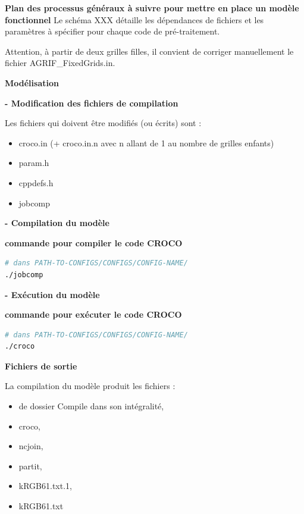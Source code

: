 \documentclass[10pt,a4paper,titlepage]{article}
\begin{document}
\begin{processEnv}{\textbf{Plan des processus généraux à suivre pour mettre en place un modèle fonctionnel}}
    Le schéma XXX détaille les dépendances de fichiers et les paramètres à spécifier pour chaque code de pré-traitement.

    Attention, à partir de deux grilles filles, il convient de corriger manuellement le fichier AGRIF\_FixedGrids.in.

    {\color{workColor}\textbf{Modélisation}}

    \textbf{- Modification des fichiers de compilation}

    Les fichiers qui doivent être modifiés (ou écrits) sont :

    \begin{itemize}
        \item croco.in (+ croco.in.n avec n allant de 1 au nombre de grilles enfants)
        \item param.h
        \item cppdefs.h
        \item jobcomp
    \end{itemize}

    \textbf{- Compilation du modèle}

    \begin{codeEnv}{\textbf{commande pour compiler le code CROCO}}
\begin{lstlisting}[language=bash]
# dans PATH-TO-CONFIGS/CONFIGS/CONFIG-NAME/
./jobcomp
\end{lstlisting}
    \end{codeEnv}

    \textbf{- Exécution du modèle}

    \begin{codeEnv}{\textbf{commande pour exécuter le code CROCO}}
\begin{lstlisting}[language=bash]
# dans PATH-TO-CONFIGS/CONFIGS/CONFIG-NAME/
./croco
\end{lstlisting}
    \end{codeEnv}

    {\color{outputColor}\textbf{Fichiers de sortie}}

    La compilation du modèle produit les fichiers :

    \begin{itemize}
        \item de dossier Compile dans son intégralité,
        \item croco,
        \item ncjoin,
        \item partit,
        \item kRGB61.txt.1,
        \item kRGB61.txt
    \end{itemize}

\end{processEnv}
\end{document}
